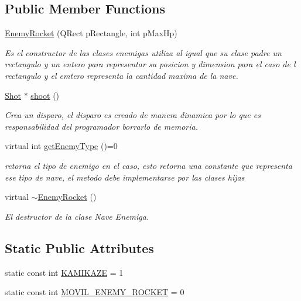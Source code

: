 \subsection*{Public Member Functions}
\begin{DoxyCompactItemize}
\item 
\hyperlink{class_enemy_rocket_a602b0809840648ca73f620968499df55}{Enemy\-Rocket} (Q\-Rect p\-Rectangle, int p\-Max\-Hp)
\begin{DoxyCompactList}\small\item\em Es el constructor de las clases enemigas utiliza al igual que su clase padre un rectangulo y un entero para representar su posicion y dimension para el caso de l rectangulo y el emtero representa la cantidad maxima de la nave. \end{DoxyCompactList}\item 
\hyperlink{class_shot}{Shot} $\ast$ \hyperlink{class_enemy_rocket_aaa119ae66d24f37445ee53f0e2184bc2}{shoot} ()
\begin{DoxyCompactList}\small\item\em Crea un disparo, el disparo es creado de manera dinamica por lo que es responsabilidad del programador borrarlo de memoria. \end{DoxyCompactList}\item 
virtual int \hyperlink{class_enemy_rocket_a44e857f29c0846545743e21638391527}{get\-Enemy\-Type} ()=0
\begin{DoxyCompactList}\small\item\em retorna el tipo de enemigo en el caso, esto retorna una constante que representa ese tipo de nave, el metodo debe implementarse por las clases hijas \end{DoxyCompactList}\item 
\hypertarget{class_enemy_rocket_abb973e1ee2e99a06789131b1dd3180ab}{virtual \hyperlink{class_enemy_rocket_abb973e1ee2e99a06789131b1dd3180ab}{$\sim$\-Enemy\-Rocket} ()}\label{class_enemy_rocket_abb973e1ee2e99a06789131b1dd3180ab}

\begin{DoxyCompactList}\small\item\em El destructor de la clase Nave Enemiga. \end{DoxyCompactList}\end{DoxyCompactItemize}
\subsection*{Static Public Attributes}
\begin{DoxyCompactItemize}
\item 
static const int \hyperlink{class_enemy_rocket_a15caca840f5e774985fecf4295d9446d}{K\-A\-M\-I\-K\-A\-Z\-E} = 1
\item 
static const int \hyperlink{class_enemy_rocket_a62103a6d3bc8dd2860b91d5250113281}{M\-O\-V\-I\-L\-\_\-\-E\-N\-E\-M\-Y\-\_\-\-R\-O\-C\-K\-E\-T} = 0
\end{DoxyCompactItemize}
